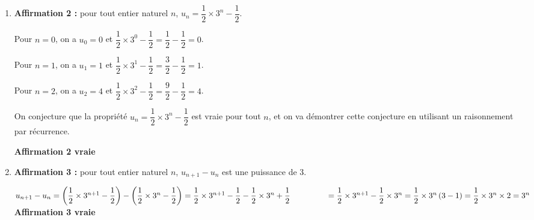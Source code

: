 \begin{enumerate}
\hfill \textbf{Affirmation 1 fausse}
	
	\item \textbf{Affirmation 2 :} \og{} pour tout entier naturel $n$, $u_{n} = \dfrac{1}{2} \times 3^{n}-\dfrac{1}{2}$.\fg{}

Pour $n=0$, on a $u_0=0$ et $\dfrac{1}{2} \times 3^{0}-\dfrac{1}{2} = \dfrac{1}{2}-\dfrac{1}{2}=0$.

Pour $n=1$, on a $u_1=1$ et $\dfrac{1}{2} \times 3^{1}-\dfrac{1}{2} = \dfrac{3}{2}-\dfrac{1}{2}=1$.

Pour $n=2$, on a $u_2=4$ et $\dfrac{1}{2} \times 3^{2}-\dfrac{1}{2} = \dfrac{9}{2}-\dfrac{1}{2}=4$.

On conjecture que la propriété \og{} $u_{n} = \dfrac{1}{2} \times 3^{n}-\dfrac{1}{2}$\fg{} est vraie pour tout $n$, et on va démontrer cette conjecture en utilisant un raisonnement par récurrence.


\hfill \textbf{Affirmation 2 vraie}

\item \textbf{Affirmation 3 :} \og{} pour tout entier naturel $n$, \quad $u_{n + 1}-u_{n}$ est une puissance de 3.\fg{}

$u_{n+1}-u_n = \left (\dfrac{1}{2}\times 3^{n+1} -\dfrac{1}{2}\right ) - \left ( \dfrac{1}{2}\times 3^{n} -\dfrac{1}{2}\right )
= \dfrac{1}{2}\times 3^{n+1} -\dfrac{1}{2} - \dfrac{1}{2}\times 3^{n} +\dfrac{1}{2}\\
\phantom{u_{n+1}-u_n}
= \dfrac{1}{2}\times 3^{n+1} - \dfrac{1}{2}\times 3^{n}
= \dfrac{1}{2}\times 3^n\left (3-1\right )
= \dfrac{1}{2}\times 3^n \times 2
= 3^n$
\hfill \textbf{Affirmation 3 vraie}
\end{enumerate}
